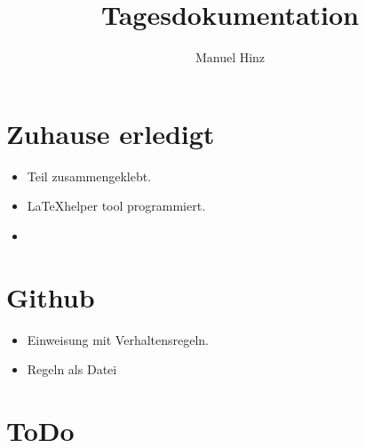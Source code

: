 \documentclass{article}
\author{Manuel Hinz}
\title{Tagesdokumentation}
\begin{document}
\maketitle

\section{Zuhause erledigt}

\begin{itemize}

\item Teil zusammengeklebt.

\item \LaTeX helper tool programmiert.

\item 

\end{itemize}

\section{Github}

\begin{itemize}

\item Einweisung mit Verhaltensregeln.

\item Regeln als Datei

\end{itemize}

\section{ToDo}
\end{document}
